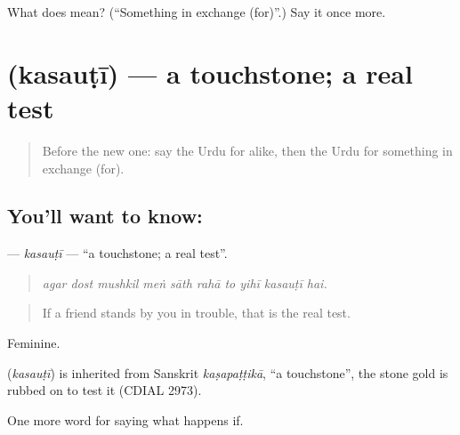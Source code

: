 \begin{tcolorbox}[breakable,colback=teal!4,colframe=teal!35!black,title={Before you move on}]
What does  mean? (\textquotedblleft{}Something in exchange (for)\textquotedblright{}.) Say it once more.
\end{tcolorbox}
\section[\texorpdfstring{\ur{کسوٹی} (kasauṭī)}{کسوٹی (kasauṭī)}]{ (kasauṭī) — a touchstone; a real test}

\label{lesson:UR-C537-kasauti}



\begin{quote}
Before the new one: say the Urdu for alike, then the Urdu for something in exchange (for).
\end{quote}

\subsection*{You'll want to know: }
\textbf{} — \emph{kasauṭī} — \textquotedblleft{}a touchstone; a real test\textquotedblright{}.

\begin{quote}
         
\end{quote}

\begin{quote}
\emph{agar dost mushkil meṅ sāth rahā to yihī kasauṭī hai.}
\end{quote}

\begin{quote}
If a friend stands by you in trouble, that is the real test.
\end{quote}

Feminine.

\begin{cousinweb}
\textbf{} (\emph{kasauṭī}) is inherited from Sanskrit \emph{kaṣapaṭṭikā}, \textquotedblleft{}a touchstone\textquotedblright{}, the stone gold is rubbed on to test it (CDIAL 2973).
\end{cousinweb}

\begin{grammarlens}[title={What you've built}]
One more word for saying what happens if.
\end{grammarlens}

